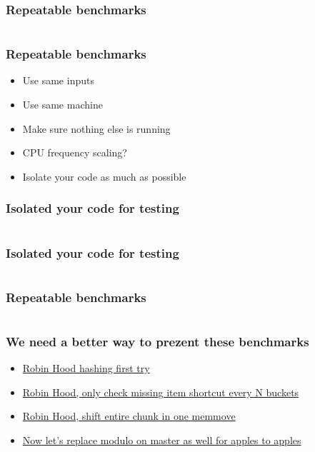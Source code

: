 \documentclass{beamer}
\begin{document}
\begin{frame}
  \frametitle{Repeatable benchmarks}
   {\fontsize{5.2pt}{5.2pt}
     \inputminted{python}{snippets/bench2.txt}
   }
\end{frame}
  
\begin{frame}
  \frametitle{Repeatable benchmarks}
  \begin{itemize}
  \item Use same inputs
  \item Use same machine
  \item Make sure nothing else is running
  \item CPU frequency scaling?
  \item Isolate your code as much as possible
  \end{itemize}
\end{frame}

\begin{frame}
  \frametitle{Isolated your code for testing}
  \inputminted[fontsize=\footnotesize]{python}{snippets/bench1.py}
\end{frame}

\begin{frame}
  \frametitle{Isolated your code for testing}
  \inputminted[fontsize=\footnotesize]{c}{snippets/bench.c}
\end{frame}

\begin{frame}
  \frametitle{Repeatable benchmarks}
   {\fontsize{4.5pt}{4.5pt}
     \inputminted{python}{snippets/bench3.txt}
   }
\end{frame}

\begin{frame}
  \frametitle{We need a better way to prezent these benchmarks}
  \begin{itemize}
  \item \href{https://devrandom.ro/talks/geekmeet22/benchmarks/prez_1/results.html}{Robin Hood hashing first try}
  \item \href{https://devrandom.ro/talks/geekmeet22/benchmarks/prez_2/results.html}{Robin Hood, only check missing item shortcut every N buckets}
  \item \href{https://devrandom.ro/talks/geekmeet22/benchmarks/prez_3/results.html}{Robin Hood, shift entire chunk in one memmove}
  \item \href{https://devrandom.ro/talks/geekmeet22/benchmarks/prez_4/results.html}{Now let's replace modulo on master as well for apples to apples}
  \end{itemize}
\end{frame}
\end{document}
